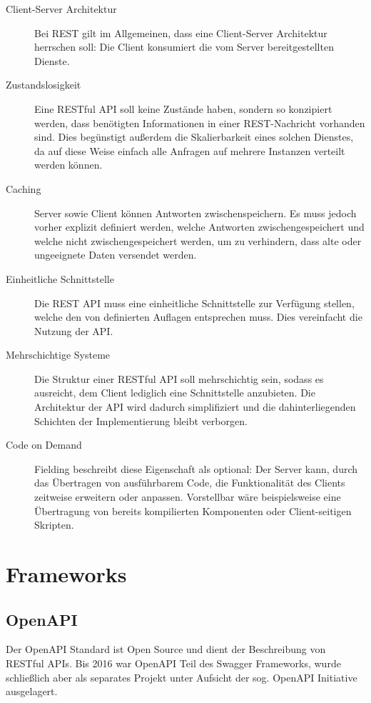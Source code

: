 		\begin{description}
			\item[Client-Server Architektur] 
				Bei \ac{REST} gilt im Allgemeinen, dass eine Client-Server Architektur herrschen soll: Die Client konsumiert die vom Server bereitgestellten Dienste. 
			\item[Zustandslosigkeit] 
				Eine RESTful \ac{API} soll keine Zustände haben, sondern so konzipiert werden, dass benötigten Informationen in einer REST-Nachricht vorhanden sind. Dies begünstigt außerdem die Skalierbarkeit eines solchen Dienstes, da auf diese Weise einfach alle Anfragen auf mehrere Instanzen verteilt werden können.
			\item[Caching] 
				Server sowie Client können Antworten zwischenspeichern. Es muss jedoch vorher explizit definiert werden, welche Antworten zwischengespeichert und welche nicht zwischengespeichert werden, um zu verhindern, dass alte oder ungeeignete Daten versendet werden.
			\item[Einheitliche Schnittstelle]
				Die \ac{REST} \ac{API} muss eine einheitliche Schnittstelle zur Verfügung stellen, welche den von \cite{RoyThomasFielding.2000} definierten Auflagen entsprechen muss. Dies vereinfacht die Nutzung der \ac{API}.
			\item[Mehrschichtige Systeme]
				 Die Struktur einer RESTful \ac{API} soll mehrschichtig sein, sodass es ausreicht, dem Client lediglich eine Schnittstelle anzubieten. Die Architektur der API wird dadurch simplifiziert und die dahinterliegenden Schichten der Implementierung bleibt verborgen.
			\item[Code on Demand] 
				Fielding beschreibt diese Eigenschaft als optional: Der Server kann, durch das Übertragen von ausführbarem Code, die Funktionalität des Clients zeitweise erweitern oder anpassen. Vorstellbar wäre beispielsweise eine Übertragung von bereits kompilierten Komponenten oder Client-seitigen Skripten. 
				
		\end{description}

	\section{Frameworks}
	
		\subsection{OpenAPI} %
		
			Der OpenAPI Standard ist Open Source und dient der Beschreibung von RESTful APIs. Bis 2016 war OpenAPI Teil des Swagger Frameworks, wurde schließlich aber als separates Projekt unter Aufsicht der sog. OpenAPI Initiative ausgelagert. 
			
